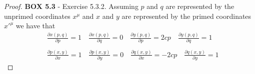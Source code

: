 \documentclass[11pt]{article}
\theoremstyle{definition}
\begin{document}
\begin{proof}{\textbf{BOX 5.3} - Exercise 5.3.2.}
    Assuming $p$ and $q$ are represented by the unprimed coordinates $x^\mu$
    and $x$ and $y$ are represented by the primed coordinates $x'^{\mu}$
    we have that
    \begin{align*}
        &\frac{\partial x(p, q)}{\partial p} = 1
        \quad
        \frac{\partial x(p, q)}{\partial q} = 0
        \quad
        \frac{\partial y(p, q)}{\partial p} = 2cp
        \quad
        \frac{\partial y(p, q)}{\partial q} = 1\\\\
        &\frac{\partial p(x, y)}{\partial x} = 1
        \quad
        \frac{\partial p(x, y)}{\partial y} = 0
        \quad
        \frac{\partial q(x, y)}{\partial x} = -2cp
        \quad
        \frac{\partial q(x, y)}{\partial y} = 1
    \end{align*}
\end{proof}
\end{document}

